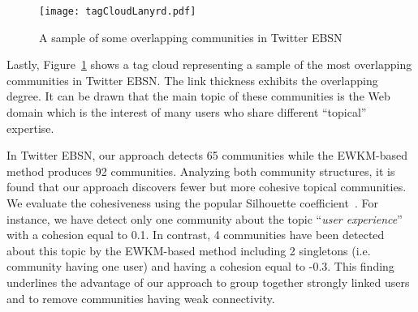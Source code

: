 \begin{table}[H]
\end{table}


\begin{figure}[htb]
  \centering
  \texttt{[image: tagCloudLanyrd.pdf]}
  \caption{A sample of some overlapping communities in Twitter EBSN}
  \label{fig:tagcloud}
\end{figure}

Lastly, Figure~\ref{fig:tagcloud} shows a tag cloud representing a sample of the most overlapping communities in Twitter EBSN. The link thickness exhibits the overlapping degree. It can be drawn that the main topic of these communities is the Web domain which is the interest of many users who share different ``topical'' expertise. 

In Twitter EBSN, our approach detects 65 communities while the EWKM-based method produces 92 communities. Analyzing both community structures, it is found that our approach discovers fewer but more cohesive topical communities. We evaluate the cohesiveness using the popular Silhouette coefficient~\cite{Rousseeuw:1987}. For instance, we have detect only one community about the topic ``\emph{user experience}'' with a cohesion equal to 0.1. In contrast, 4 communities have been detected about this topic by the EWKM-based method including  2 singletons  (i.e. community having one user)  and having a cohesion equal to -0.3. This finding underlines the advantage of our approach to group together strongly linked users and to remove communities having weak connectivity.

